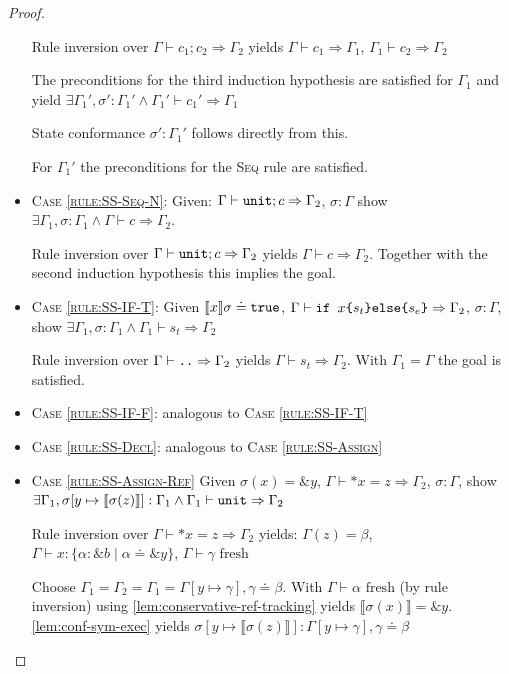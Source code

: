 \documentclass[twoside, english]{sdqthesis}
\newcommand{\bbracket}[1]{\llbracket #1 \rrbracket}
\theoremstyle{definition}
\begin{document}
\begin{proof}
\begin{itemize}
    Rule inversion over $\Gamma \vdash c_1 ; c_2 \Rightarrow \Gamma_2$ yields $\Gamma \vdash c_1 \Rightarrow \Gamma_1$, $\Gamma_1 \vdash c_2 \Rightarrow \Gamma_2$

    The preconditions for the third induction hypothesis are satisfied for $\Gamma_1$ and yield 
    $\exists \Gamma_1', \sigma' : \Gamma_1' \wedge \Gamma_1' \vdash c_1' \Rightarrow \Gamma_1$

    State conformance $\sigma' : \Gamma_1'$ follows directly from this.

    For $\Gamma_1'$ the preconditions for the \textsc{Seq} rule are satisfied.
  \item \textsc{Case \cref{rule:SS-Seq-N}}: 
    Given: $\Gamma \vdash \code{unit}; c \Rightarrow \Gamma_2$, $\sigma : \Gamma$
    show $\exists \Gamma_1, \sigma : \Gamma_1 \wedge \Gamma \vdash c \Rightarrow \Gamma_2$.

    Rule inversion over $\Gamma \vdash \code{unit}; c \Rightarrow \Gamma_2$ yields $\Gamma \vdash c \Rightarrow \Gamma_2$.
    Together with the second induction hypothesis this implies the goal.
  \item \textsc{Case \cref{rule:SS-IF-T}}:
     Given $\llbracket x \rrbracket \sigma \doteq \code{true}$, $\Gamma \vdash \code{if $x$\{$s_t$\}else\{$s_e$\}} \Rightarrow \Gamma_2$, $\sigma : \Gamma$, show $\exists \Gamma_1, \sigma : \Gamma_1 \wedge \Gamma_1 \vdash s_t \Rightarrow \Gamma_2$
    
    Rule inversion over $\Gamma \vdash \code{..} \Rightarrow \Gamma_2$ yields $\Gamma \vdash s_t \Rightarrow \Gamma_2$.
    With $\Gamma_1 = \Gamma$ the goal is satisfied.
  \item \textsc{Case \cref{rule:SS-IF-F}}: analogous to \textsc{Case \cref{rule:SS-IF-T}}
  \item \textsc{Case \cref{rule:SS-Decl}}: analogous to \textsc{Case \cref{rule:SS-Assign}}
  \item \textsc{Case \cref{rule:SS-Assign-Ref}}
    Given $ \sigma(x) = \&y $, $\Gamma \vdash *x = z \Rightarrow \Gamma_2$, $\sigma : \Gamma$, show
    $\exists \Gamma_1, \sigma[y \mapsto \bbracket{\sigma(z)}] : \Gamma_1 \wedge \Gamma_1 \vdash \code{unit} \Rightarrow \Gamma_2$

    Rule inversion over $\Gamma \vdash *x = z \Rightarrow \Gamma_2$ yields:
    $\Gamma(z) = \beta$, $\Gamma \vdash x: \{\alpha : \&b \mid \alpha \doteq \&y\}$, $\Gamma \vdash \gamma \text{ fresh}$

    Choose $\Gamma_1 = \Gamma_2 = \Gamma_1 = \Gamma[y \mapsto \gamma], \gamma \doteq \beta$.
    With $\Gamma \vdash \alpha \text{ fresh}$ (by rule inversion) using \cref{lem:conservative-ref-tracking} yields $\bbracket{\sigma(x)} = \&y$.
    \cref{lem:conf-sym-exec} yields $\sigma[y \mapsto \bbracket{\sigma(z)}] : \Gamma[y \mapsto \gamma], \gamma \doteq \beta$


\end{itemize}
\end{proof}
\end{document}
